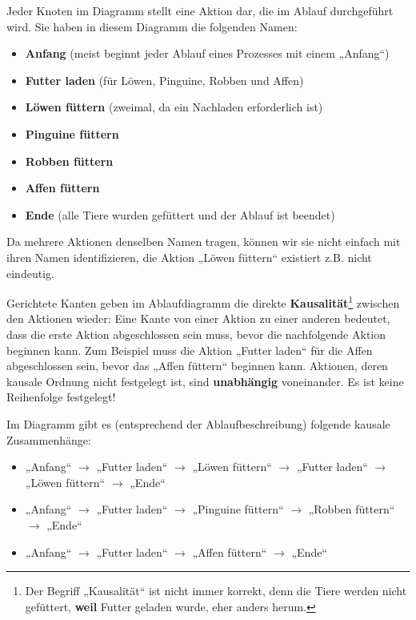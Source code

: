 Jeder Knoten im Diagramm stellt eine Aktion dar, die im Ablauf durchgeführt
wird. Sie haben in diesem Diagramm die folgenden Namen:
\begin{itemize}
	\item \textbf{Anfang} (meist beginnt jeder Ablauf eines Prozesses mit einem „Anfang“)
	
	\item \textbf{Futter laden} (für Löwen, Pinguine, Robben und Affen)
	
	\item \textbf{Löwen füttern} (zweimal, da ein Nachladen erforderlich ist)
	
	\item \textbf{Pinguine füttern}
	
	\item \textbf{Robben füttern}
	
	\item \textbf{Affen füttern}
	
	\item \textbf{Ende} (alle Tiere wurden gefüttert und der Ablauf ist beendet)
\end{itemize}

Da mehrere Aktionen denselben Namen tragen, können wir sie nicht einfach mit ihren Namen identifizieren, die Aktion „Löwen füttern“ existiert z.B. nicht eindeutig.

Gerichtete Kanten 
geben im Ablaufdiagramm die direkte \textbf{Kausalität}\footnote{Der Begriff „Kausalität“ ist nicht immer korrekt, denn die Tiere werden nicht gefüttert, \textbf{weil} Futter geladen wurde, eher anders herum.} zwischen den Aktionen wieder: Eine Kante von einer Aktion zu einer anderen bedeutet, dass die erste Aktion abgeschlossen sein muss, bevor die nachfolgende Aktion beginnen kann. Zum Beispiel muss die Aktion „Futter laden“ für die Affen abgeschlossen sein, bevor das „Affen füttern“ beginnen kann. Aktionen, deren kausale Ordnung nicht festgelegt ist, sind \textbf{unabhängig} voneinander. Es ist keine Reihenfolge festgelegt! 

\pagebreak

Im Diagramm gibt es (entsprechend der Ablaufbeschreibung) folgende kausale Zusammenhänge:
\begin{itemize}
	\item „Anfang“ $\rightarrow$ „Futter laden“ $\rightarrow$ „Löwen füttern“ $\rightarrow$ „Futter laden“ $\rightarrow$ „Löwen füttern“ $\rightarrow$ „Ende“
	
	\item „Anfang“ $\rightarrow$ „Futter laden“ $\rightarrow$ „Pinguine füttern“ $\rightarrow$ „Robben füttern“ $\rightarrow$ „Ende“
	
	\item „Anfang“ $\rightarrow$ „Futter laden“ $\rightarrow$ „Affen füttern“ $\rightarrow$ „Ende“
\end{itemize}

